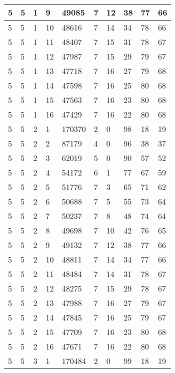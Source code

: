 \begin{table}[!ht]
\begin{tabular}{|l|l|l|l|l|l|l|l|l|l|}
        5 & 5 & 1 & 9 & 49085 & 7 & 12 & 38 & 77 & 66 \\ \hline
        5 & 5 & 1 & 10 & 48616 & 7 & 14 & 34 & 78 & 66 \\ \hline
        5 & 5 & 1 & 11 & 48407 & 7 & 15 & 31 & 78 & 67 \\ \hline
        5 & 5 & 1 & 12 & 47987 & 7 & 15 & 29 & 79 & 67 \\ \hline
        5 & 5 & 1 & 13 & 47718 & 7 & 16 & 27 & 79 & 68 \\ \hline
        5 & 5 & 1 & 14 & 47598 & 7 & 16 & 25 & 80 & 68 \\ \hline
        5 & 5 & 1 & 15 & 47563 & 7 & 16 & 23 & 80 & 68 \\ \hline
        5 & 5 & 1 & 16 & 47429 & 7 & 16 & 22 & 80 & 68 \\ \hline
        5 & 5 & 2 & 1 & 170370 & 2 & 0 & 98 & 18 & 19 \\ \hline
        5 & 5 & 2 & 2 & 87179 & 4 & 0 & 96 & 38 & 37 \\ \hline
        5 & 5 & 2 & 3 & 62019 & 5 & 0 & 90 & 57 & 52 \\ \hline
        5 & 5 & 2 & 4 & 54172 & 6 & 1 & 77 & 67 & 59 \\ \hline
        5 & 5 & 2 & 5 & 51776 & 7 & 3 & 65 & 71 & 62 \\ \hline
        5 & 5 & 2 & 6 & 50688 & 7 & 5 & 55 & 73 & 64 \\ \hline
        5 & 5 & 2 & 7 & 50237 & 7 & 8 & 48 & 74 & 64 \\ \hline
        5 & 5 & 2 & 8 & 49698 & 7 & 10 & 42 & 76 & 65 \\ \hline
        5 & 5 & 2 & 9 & 49132 & 7 & 12 & 38 & 77 & 66 \\ \hline
        5 & 5 & 2 & 10 & 48811 & 7 & 14 & 34 & 77 & 66 \\ \hline
        5 & 5 & 2 & 11 & 48484 & 7 & 14 & 31 & 78 & 67 \\ \hline
        5 & 5 & 2 & 12 & 48275 & 7 & 15 & 29 & 78 & 67 \\ \hline
        5 & 5 & 2 & 13 & 47988 & 7 & 16 & 27 & 79 & 67 \\ \hline
        5 & 5 & 2 & 14 & 47845 & 7 & 16 & 25 & 79 & 67 \\ \hline
        5 & 5 & 2 & 15 & 47709 & 7 & 16 & 23 & 80 & 68 \\ \hline
        5 & 5 & 2 & 16 & 47671 & 7 & 16 & 22 & 80 & 68 \\ \hline
        5 & 5 & 3 & 1 & 170484 & 2 & 0 & 99 & 18 & 19 \\ \hline

\end{tabular}
\end{table}
